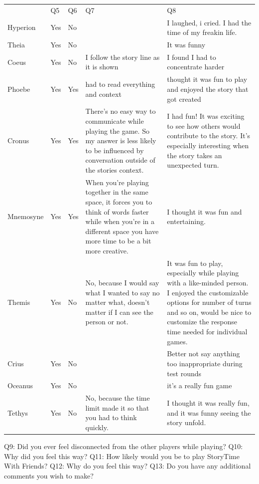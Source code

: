 \documentclass{sigchi}
\begin{document}
\begin{table}[ht]
\begin{tabularx}{\linewidth}{>{\raggedright}X | >{\raggedright}X | >{\raggedright}X | >{\raggedright}X | >{\raggedright}X }
 & Q5 & Q6 & Q7 & Q8 \tabularnewline
Hyperion & Yes & No &  & I laughed, i cried. I had the time of my freakin life.  \tabularnewline \hline
Theia  & Yes & No &  & It was funny \tabularnewline \hline
Coeus  & Yes & No & I follow the story line as it is shown & I found I had to concentrate harder \tabularnewline \hline
Phoebe  & Yes & Yes & had to read everything and context & thought it was fun to play and enjoyed the story that got created \tabularnewline \hline
Cronus  & Yes & Yes & There's no easy way to communicate while playing the game. So my answer is less likely to be influenced by conversation outside of the stories context. & I had fun! It was exciting to see how others would contribute to the story. It's especially interesting when the story takes an unexpected turn. \tabularnewline \hline
Mnemosyne  & Yes & Yes & When you're playing together in the same space, it forces you to think of words faster while when you're in a different space you have more time to be a bit more creative.  & I thought it was fun and entertaining.  \tabularnewline \hline
Themis  & Yes & No & No, because I would say what I wanted to say no matter what, doesn't matter if I can see the person or not. & It was fun to play, especially while playing with a like-minded person. I enjoyed the customizable options for number of turns and so on, would be nice to customize the response time needed for individual games. \tabularnewline \hline
Crius   & Yes & No &  & Better not say anything too inappropriate during test rounds \tabularnewline \hline
Oceanus & Yes & No &  & it's a really fun game \tabularnewline \hline
Tethys & Yes & No & No, because the time limit made it so that you had to think quickly. & I thought it was really fun, and it was funny seeing the story unfold. \tabularnewline
\end{tabularx}
\end{table}

\FloatBarrier
\newpage
Q9: Did you ever feel disconnected from the other players while playing?\newline
Q10: Why did you feel this way?\newline
Q11: How likely would you be to play StoryTime With Friends?\newline
Q12: Why do you feel this way?\newline
Q13: Do you have any additional comments you wish to make?\newline
\end{document}

